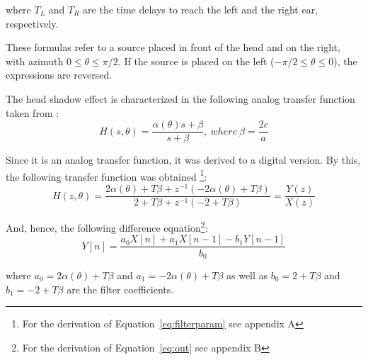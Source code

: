 \documentclass[journal]{IEEEtran}
\begin{document}
where $T_{L}$ and $T_{R}$ are the time delays to reach the left and the right ear, respectively. 

These formulas refer to a source placed in front of the head and on the right, with azimuth $0 \leq \theta \leq \pi/2$. If the source is placed on the left ($- \pi/2 \leq \theta \leq 0$), the expressions are reversed.



The head shadow effect is characterized in the following analog transfer function taken from \cite{Brown1997}:
\begin{equation}\label{eq:analog}
H\left( s,\theta\right) = \frac{\alpha (\theta)s+\beta}{s+\beta},\: where\:\beta = \frac{2c}{a}
\end{equation}


Since it is an analog transfer function, it was derived to a digital version. By this, the following transfer function was obtained \footnote{For the derivation of Equation~\ref{eq:filterparam} see appendix A}:
\begin{equation}\label{eq:filterparam}
H\left( z,\theta\right) = \frac{2\alpha (\theta)+T\beta+z^{-1}(-2\alpha(\theta)+T\beta)}{2+T\beta+z^{-1}(-2+T\beta)} = \frac{Y(z)}{X(z)}
\end{equation} 

And, hence, the following difference equation\footnote{For the derivation of Equation~\ref{eq:out} see appendix B}:
\begin{equation}\label{eq:out}
Y[n] =\frac{a_0X[n]+a_1X[n-1]-b_1Y[n-1]}{b_0}
\end{equation} 

where $a_0 = 2\alpha (\theta)+T\beta$ and $a_1 = -2\alpha(\theta)+T\beta$ as well as $b_0 = 2+T\beta$ and $b_1 = -2+T\beta$ are the filter coefficients.\\

\end{document}
